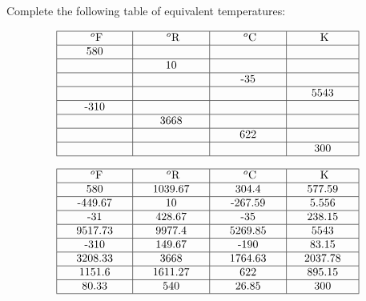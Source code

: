 

Complete the following table of equivalent temperatures:


$$\vbox{\offinterlineskip
\halign{\strut
\vrule \quad\hfil # \ \hfil & 
\vrule \quad\hfil # \ \hfil & 
\vrule \quad\hfil # \ \hfil & 
\vrule \quad\hfil # \ \hfil \vrule \cr
\noalign{\hrule}
%
\hskip 20pt $^{o}$F \hskip 20pt & \hskip 20pt $^{o}$R \hskip 20pt & \hskip 20pt $^{o}$C \hskip 20pt & \hskip 20pt K \hskip 20pt \cr
%
\noalign{\hrule}
%
580 &  &  &  \cr
%
\noalign{\hrule}
%
  & 10 &  &  \cr
%
\noalign{\hrule}
%
  &  & -35 &  \cr
%
\noalign{\hrule}
%
  &  &  & 5543 \cr
%
\noalign{\hrule}
%
-310  &  &  &  \cr
%
\noalign{\hrule}
%
  & 3668 &  &  \cr
%
\noalign{\hrule}
%
  &  & 622 &  \cr
%
\noalign{\hrule}
%
  &  &  & 300 \cr
%
\noalign{\hrule}
} %
}$$ %








$$\vbox{\offinterlineskip
\halign{\strut
\vrule \quad\hfil # \ \hfil & 
\vrule \quad\hfil # \ \hfil & 
\vrule \quad\hfil # \ \hfil & 
\vrule \quad\hfil # \ \hfil \vrule \cr
\noalign{\hrule}
%
\hskip 20pt $^{o}$F \hskip 20pt & \hskip 20pt $^{o}$R \hskip 20pt & \hskip 20pt $^{o}$C \hskip 20pt & \hskip 20pt K \hskip 20pt \cr
%
\noalign{\hrule}
%
580 & 1039.67 & 304.4 & 577.59 \cr
%
\noalign{\hrule}
%
-449.67  & 10 & -267.59 & 5.556 \cr
%
\noalign{\hrule}
%
-31 & 428.67 & -35 & 238.15 \cr
%
\noalign{\hrule}
%
9517.73 & 9977.4 & 5269.85 & 5543 \cr
%
\noalign{\hrule}
%
-310 & 149.67 & -190 & 83.15 \cr
%
\noalign{\hrule}
%
3208.33 & 3668 & 1764.63 & 2037.78 \cr
%
\noalign{\hrule}
%
1151.6 & 1611.27 & 622 & 895.15 \cr
%
\noalign{\hrule}
%
80.33 & 540 & 26.85 & 300 \cr
%
\noalign{\hrule}
} %
}$$ %











